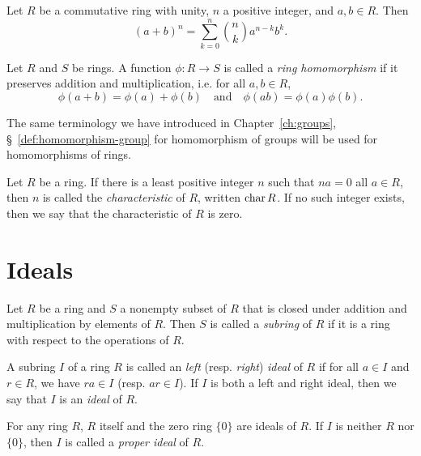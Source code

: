 \begin{theorem}
    Let \(R\) be a commutative ring with unity, \(n\) a positive integer, and \(a, b \in R\). Then
    \[
        (a + b)^n = \sum_{k=0}^{n} \binom{n}{k} a^{n-k} b^k.
    \]
\end{theorem}

\begin{definition}
    Let \(R\) and \(S\) be rings. A function \(\phi: R \to S\) is called a \emph{ring homomorphism} if it preserves addition and multiplication, i.e. for all \(a, b \in R\),
    \[
        \phi(a + b) = \phi(a) + \phi(b) \quad \text{and} \quad \phi(ab) = \phi(a)\phi(b).
    \]

    The same terminology we have introduced in Chapter~\ref{ch:groups}, \S~\ref{def:homomorphism-group} for homomorphism of groups will be used for homomorphisms of rings.
\end{definition}

\begin{definition}
    Let \(R\) be a ring. If there is a least positive integer \(n\) such that \(na = 0\) all \(a \in R\), then \(n\) is called the \emph{characteristic} of \(R\), written \(\operatorname{char} R\). If no such integer exists, then we say that the characteristic of \(R\) is zero.
\end{definition}

\section{Ideals}

\begin{definition}
    Let \(R\) be a ring and \(S\) a nonempty subset of \(R\) that is closed under addition and multiplication by elements of \(R\). Then \(S\) is called a \emph{subring} of \(R\) if it is a ring with respect to the operations of \(R\).
\end{definition}

\begin{definition}
    A subring \(I\) of a ring \(R\) is called an \emph{left} (resp. \emph{right}) \emph{ideal} of \(R\) if for all \(a \in I\) and \(r \in R\), we have \(ra \in I\) (resp. \(ar \in I\)). If \(I\) is both a left and right ideal, then we say that \(I\) is an \emph{ideal} of \(R\).
\end{definition}

\begin{example}
    For any ring \(R\), \(R\) itself and the zero ring \(\{0\}\) are ideals of \(R\). If \(I\) is neither \(R\) nor \(\{0\}\), then \(I\) is called a \emph{proper ideal} of \(R\).
\end{example}

